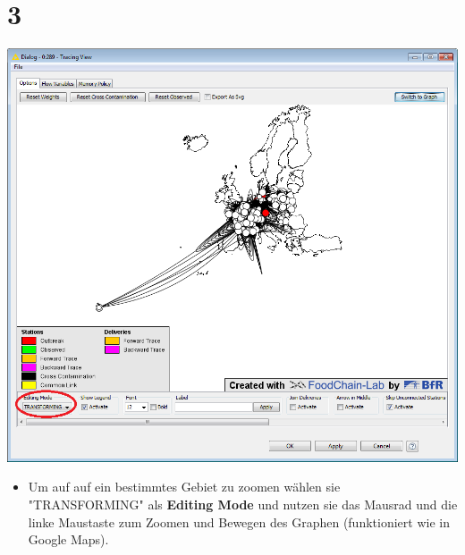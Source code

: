 \documentclass{beamer}
\begin{document}
\section{3}
\begin{frame}
	\begin{center}
  		\includegraphics[height=0.6\textheight]{3.png}
	\end{center}
	\begin{itemize}
		\item Um auf auf ein bestimmtes Gebiet zu zoomen wählen sie "TRANSFORMING" als \textbf{Editing Mode} und nutzen sie das Mausrad und die linke Maustaste zum Zoomen und Bewegen des Graphen (funktioniert wie in Google Maps).
	\end{itemize}
\end{frame}
\end{document}
